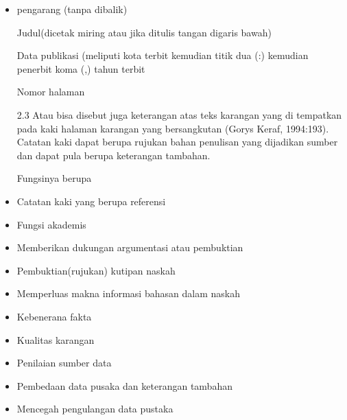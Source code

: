 \begin{itemize}
	\item pengarang (tanpa dibalik)\par

Judul(dicetak miring atau jika ditulis tangan digaris bawah)\par

Data publikasi (meliputi kota terbit kemudian titik dua (:) kemudian penerbit koma (,) tahun terbit\par

Nomor halaman\par

2.3 Atau bisa disebut juga keterangan atas teks karangan yang di tempatkan pada kaki halaman karangan yang bersangkutan (Gorys Keraf, 1994:193). Catatan kaki dapat berupa rujukan bahan penulisan yang dijadikan sumber dan dapat pula berupa keterangan tambahan.\par

Fungsinya berupa\par

	\item Catatan kaki yang berupa referensi\par

	\item Fungsi akademis\par

	\item Memberikan dukungan argumentasi atau pembuktian\par

	\item Pembuktian(rujukan) kutipan naskah\par

	\item Memperluas makna informasi bahasan dalam naskah\par

	\item Kebenerana fakta\par

	\item Kualitas karangan\par

	\item Penilaian sumber data\par

	\item Pembedaan data pusaka dan keterangan tambahan\par

	\item Mencegah pengulangan data pustaka\par


\end{itemize}
